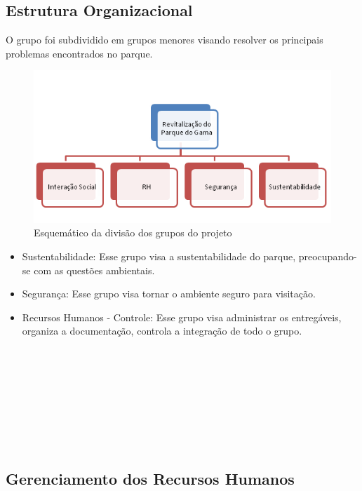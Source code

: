 \subsection{Estrutura Organizacional}

O grupo foi subdividido em grupos menores visando resolver os principais problemas encontrados no parque.

\begin{figure}[h]
	\centering
	\label{Estrutura Organizacional}
		\includegraphics[keepaspectratio=true,scale=1.0]{figuras/EstruturaOrganizacional.png}
	\caption{Esquem\'atico da divis\~ao dos grupos do projeto}
\end{figure}

\begin{itemize}
        \item Sustentabilidade: Esse grupo visa a sustentabilidade do parque, preocupando-se com as quest\~oes ambientais.
	\item Seguran\c{c}a: Esse grupo visa tornar o ambiente seguro para visita\c{c}\~ao.
	\item Recursos Humanos - Controle: Esse grupo visa administrar os entreg\'aveis, organiza a documenta\c{c}\~ao, controla a integra\c{c}\~ao de todo o grupo. \\ \\ \\ \\ \\ \\ \\ \\ \\ 
\end{itemize}

\subsection{Gerenciamento dos Recursos Humanos}

